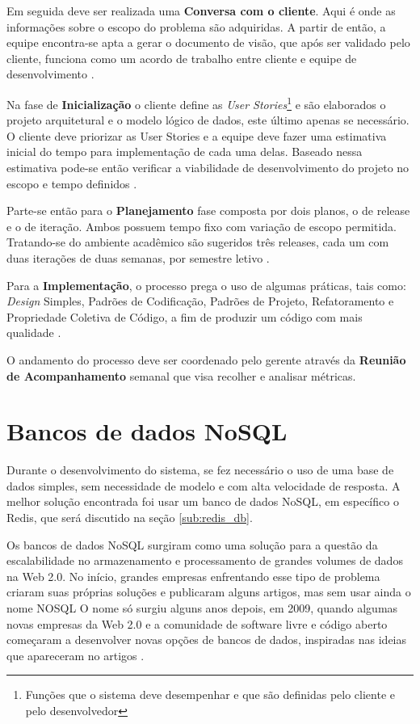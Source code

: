 \documentclass[a4paper,12pt]{monografia}
\begin{document}
Em seguida deve ser realizada uma \textbf{Conversa com o cliente}. Aqui é onde as informações sobre o escopo do problema
são adquiridas. A partir de então, a equipe encontra-se apta a gerar o documento de visão, que após ser validado pelo cliente, funciona como um acordo de trabalho entre cliente e equipe de desenvolvimento \cite{easyprocess}.

Na fase de \textbf{Inicialização} o cliente define as \textit{User Stories}\footnote{Funções que o sistema deve desempenhar e que são definidas pelo cliente e pelo desenvolvedor} e são elaborados o projeto arquitetural e o modelo lógico de dados, este último apenas se necessário. O cliente deve priorizar as User Stories e a equipe deve fazer uma estimativa inicial do tempo para implementação de cada uma delas. Baseado nessa estimativa pode-se então verificar a viabilidade de desenvolvimento do projeto no escopo e tempo definidos \cite{easyprocess}.

Parte-se então para o \textbf{Planejamento} fase composta por dois planos, o de release e o de iteração. Ambos possuem tempo fixo com variação de escopo permitida. Tratando-se do ambiente acadêmico são sugeridos três releases, cada um com duas iterações de duas semanas, por semestre letivo \cite{easyprocess}. 

Para a \textbf{Implementação}, o processo prega o uso de algumas práticas, tais como: \textit{Design} Simples, Padrões de Codificação, Padrões de Projeto, Refatoramento e Propriedade Coletiva de Código, a fim de produzir um código com mais qualidade \cite{easyprocess}. 

O andamento do processo deve ser coordenado pelo gerente através da \textbf{Reunião de Acompanhamento} semanal que visa recolher e analisar métricas.

\section{Bancos de dados NoSQL} %
\label{sec:bancos_de_dados_nosql}

Durante o desenvolvimento do sistema, se fez necessário o uso de uma base de dados simples, sem necessidade de modelo e com alta velocidade de resposta. A melhor solução encontrada foi usar um banco de dados NoSQL, em específico o Redis, que será discutido na seção \ref{sub:redis_db}.

Os bancos de dados NoSQL surgiram como uma solução para a questão da escalabilidade no armazenamento e processamento de grandes volumes de dados na Web 2.0. No início, grandes empresas enfrentando esse tipo de problema criaram suas próprias soluções e publicaram alguns artigos, mas sem usar ainda o nome NOSQL O nome só surgiu alguns anos depois, em 2009, quando algumas novas empresas da Web 2.0 e a comunidade de software livre e código aberto começaram a desenvolver novas opções de bancos de dados, inspiradas nas ideias que apareceram no artigos \cite{de2010nosql}.
\end{document}
